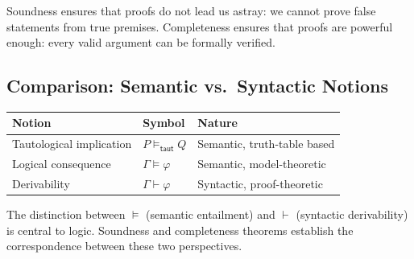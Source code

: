 \begin{remark}
Soundness ensures that proofs do not lead us astray: we cannot prove false
statements from true premises. Completeness ensures that proofs are powerful
enough: every valid argument can be formally verified.
\end{remark}

\subsection{Comparison: Semantic vs.\ Syntactic Notions}

\begin{center}
\renewcommand{\arraystretch}{1.3}
\begin{tabular}{|l|l|l|}
\hline
\textbf{Notion} & \textbf{Symbol} & \textbf{Nature} \\
\hline
Tautological implication & $P \models_{\mathsf{taut}} Q$ & Semantic, truth-table based \\
Logical consequence & $\Gamma \models \varphi$ & Semantic, model-theoretic \\
Derivability & $\Gamma \vdash \varphi$ & Syntactic, proof-theoretic \\
\hline
\end{tabular}
\end{center}

\begin{remark}
The distinction between $\models$ (semantic entailment) and $\vdash$ (syntactic
derivability) is central to logic. Soundness and completeness theorems establish
the correspondence between these two perspectives.
\end{remark}


